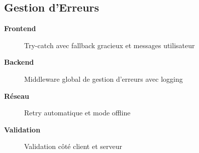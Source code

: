 \subsection{Gestion d'Erreurs}

\begin{description}
    \item[\textbf{Frontend}] Try-catch avec fallback gracieux et messages utilisateur
    \item[\textbf{Backend}] Middleware global de gestion d'erreurs avec logging
    \item[\textbf{Réseau}] Retry automatique et mode offline
    \item[\textbf{Validation}] Validation côté client et serveur
\end{description}